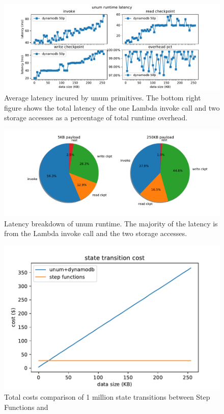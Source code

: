 \begin{figure}[t!]
    \centering
    \includegraphics[width=\columnwidth]{figures/OpLatency.pdf}
    \caption{Average latency incured by unum primitives. The bottom right
    figure shows the total latency of the one Lambda invoke call and two
    storage accesses as a percentage of total runtime overhead.}
    \label{fig:oplatency}
\end{figure}

\begin{figure}[t!]
    \centering
    \includegraphics[width=\columnwidth]{figures/OpLatency-pct.pdf}
    \caption{Latency breakdown of unum runtime. The majority of the latency is
    from the Lambda invoke call and the two storage accesses.}
    \label{fig:oplatency-pct}
\end{figure}


\begin{figure}[t!]
    \centering
    \includegraphics[width=\columnwidth]{figures/TotalCost.pdf}
    \caption{Total costs comparison of 1 million state transitions between
    Step Functions and \name{}}
    \label{fig:total-costs}
\end{figure}


